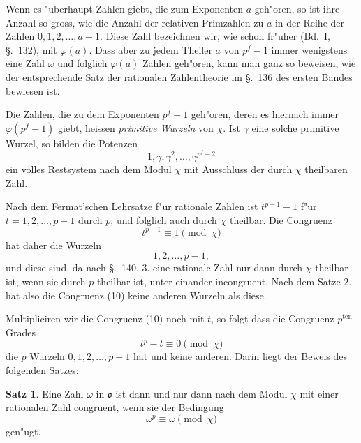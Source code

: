 \documentclass[12pt,a4paper]{article}
\theoremstyle{definition}
\newtheorem*{satz}{Satz}
\begin{document}
Wenn es "uberhaupt Zahlen giebt, die zum Exponenten $a$ geh"oren, so ist ihre Anzahl so gross, wie die Anzahl der relativen Primzahlen zu $a$ in der Reihe der Zahlen $0, 1, 2, \dots, a-1$. Diese Zahl bezeichnen wir, wie schon fr"uher (Bd.~I, \S.~132), mit $\varphi(a)$. Dass aber zu jedem Theiler $a$ von $p^f - 1$ immer wenigstens eine Zahl $\omega$ und folglich $\varphi(a)$ Zahlen geh"oren, kann man ganz so beweisen, wie der entsprechende Satz der rationalen Zahlentheorie im \S.~136 des ersten Bandes bewiesen ist.

Die Zahlen, die zu dem Exponenten $p^f - 1$ geh"oren, deren es hiernach immer $\varphi(p^f - 1)$ giebt, heissen \emph{primitive Wurzeln} von $\chi$. Ist $\gamma$ eine solche primitive Wurzel, so bilden die Potenzen
\begin{equation}
1, \gamma, \gamma^2, \dots, \gamma^{p^f-2}
\end{equation}
ein volles Restsystem nach dem Modul $\chi$ mit Ausschluss der durch $\chi$ theilbaren Zahl.

Nach dem Fermat'schen Lehrsatze f"ur rationale Zahlen ist $t^{p-1} - 1$ f"ur $t = 1, 2, \dots, p-1$ durch $p$, und folglich auch durch $\chi$ theilbar. Die Congruenz
\begin{equation}
t^{p-1} \equiv 1 \pmod{\chi}
\end{equation}
hat daher die Wurzeln
\begin{equation}
1, 2, \dots, p-1,
\end{equation}
und diese sind, da nach \S.~140, 3. eine rationale Zahl nur dann durch $\chi$ theilbar ist, wenn sie durch $p$ theilbar ist, unter einander incongruent. Nach dem Satze 2. hat also die Congruenz (10) keine anderen Wurzeln als diese.

Multipliciren wir die Congruenz (10) noch mit $t$, so folgt dass die Congruenz $p^{\text{ten}}$ Grades
\begin{equation}
t^p - t \equiv 0 \pmod{\chi}
\end{equation}
die $p$ Wurzeln $0, 1, 2, \dots, p-1$ hat und keine anderen. Darin liegt der Beweis des folgenden Satzes:

\begin{satz}
Eine Zahl $\omega$ in $\mathfrak{o}$ ist dann und nur dann nach dem Modul $\chi$ mit einer rationalen Zahl congruent, wenn sie der Bedingung
\begin{equation}
\omega^p \equiv \omega \pmod{\chi}
\end{equation}
gen"ugt.
\end{satz}
\end{document}
